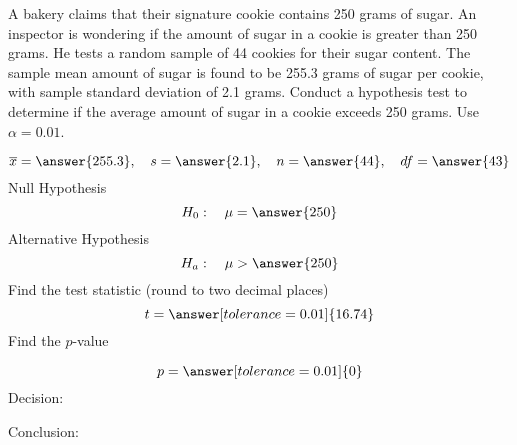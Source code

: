 \documentclass{ximera}
\begin{document}
 
 \begin{problem}\label{prob:140hom8prob2}
A bakery claims that their signature cookie contains 250 grams of sugar.  An inspector is wondering if the amount of sugar in a cookie is greater than 250 grams.  He tests a random sample of 44 cookies for their sugar content.  The sample mean amount of sugar is found to be 255.3 grams of sugar per cookie, with sample standard deviation of 2.1 grams.  Conduct a hypothesis test to determine if the average amount of sugar in a cookie exceeds 250 grams.  Use $\alpha=0.01$.

$$\overline{x}=\answer{255.3},\quad s=\answer{2.1},\quad n=\answer{44},\quad df=\answer{43}$$
Null Hypothesis
$$H_0:\quad \mu=\answer{250}$$
Alternative Hypothesis
$$H_a:\quad \mu>\answer{250}$$
Find the test statistic (round to two decimal places)
$$t=\answer[tolerance=0.01]{16.74}$$
Find the $p$-value
\begin{center}  
\end{center}
$$p=\answer[tolerance=0.01]{0}$$
Decision:

\begin{multipleChoice} 
\end{multipleChoice}  

Conclusion:

\begin{multipleChoice} 
\end{multipleChoice} 
\end{problem}
\end{document}
